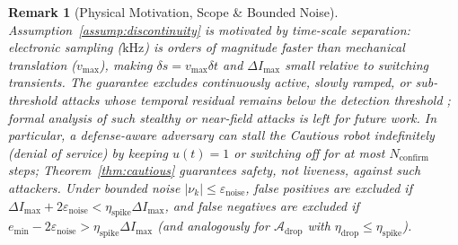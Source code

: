 \documentclass[10pt, a4paper, twocolumn]{article}
\newtheorem{remark}{Remark}
\begin{document}
\begin{remark}[Physical Motivation, Scope \& Bounded Noise]
Assumption~\ref{assump:discontinuity} is motivated by time-scale separation: electronic sampling ($\text{kHz}$) is orders of magnitude faster than mechanical translation ($v_{\max}$), making $\delta s = v_{\max}\delta t$ and $\Delta I_{\max}$ small relative to switching transients. The guarantee excludes continuously active, slowly ramped, or sub-threshold attacks whose temporal residual remains below the detection threshold \cite{psiaki2016gnss}; formal analysis of such stealthy or near-field attacks is left for future work. In particular, a defense-aware adversary can stall the Cautious robot indefinitely (denial of service) by keeping $u(t) = 1$ or switching off for at most $N_{\text{confirm}}$ steps; Theorem~\ref{thm:cautious} guarantees safety, not liveness, against such attackers. Under bounded noise $|\nu_k| \le \varepsilon_{\text{noise}}$, false positives are excluded if $\Delta I_{\max} + 2\varepsilon_{\text{noise}} < \eta_{\text{spike}}\Delta I_{\max}$, and false negatives are excluded if $e_{\min} - 2\varepsilon_{\text{noise}} > \eta_{\text{spike}}\Delta I_{\max}$ (and analogously for $\mathcal{A}_{\text{drop}}$ with $\eta_{\text{drop}} \le \eta_{\text{spike}}$).
\end{remark}
\end{document}

